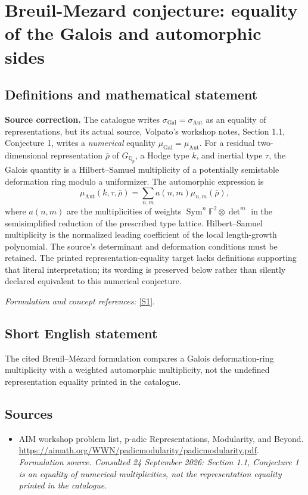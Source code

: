 \documentclass[11pt]{article}
\begin{document}
\section*{\texorpdfstring{Breuil-Mezard conjecture: equality of the Galois and automorphic sides}{Breuil-Mezard conjecture: equality of the Galois and automorphic sides}}\label{statement}
\subsection{Definitions and mathematical statement}
\textbf{Source correction.} The catalogue writes $\sigma_{\mathrm{Gal}}=\sigma_{\mathrm{Aut}}$ as an equality of representations, but its actual source, Volpato's workshop notes, Section 1.1, Conjecture 1, writes a \emph{numerical} equality $\mu_{\mathrm{Gal}}=\mu_{\mathrm{Aut}}$. For a residual two-dimensional representation $\bar\rho$ of $G_{{\mathbb{Q}}_p}$, a Hodge type $k$, and inertial type $\tau$, the Galois quantity is a Hilbert--Samuel multiplicity of a potentially semistable deformation ring modulo a uniformizer. The automorphic expression is
\[
 \mu_{\mathrm{Aut}}(k,\tau,\bar\rho)=\sum_{n,m}a(n,m)\mu_{n,m}(\bar\rho),
\]
where $a(n,m)$ are the multiplicities of weights
$\operatorname{Sym}^n{\mathbb{F}}^2\otimes\det^m$ in the semisimplified reduction of the prescribed type lattice. Hilbert--Samuel multiplicity is the normalized leading coefficient of the local length-growth polynomial. The source's determinant and deformation conditions must be retained. The printed representation-equality target lacks definitions supporting that literal interpretation; its wording is preserved below rather than silently declared equivalent to this numerical conjecture.
\par\smallskip\textit{Formulation and concept references:} \href{https://aimath.org/WWN/padicmodularity/padicmodularity.pdf}{[S1]}.

\subsection{Short English statement}
The cited Breuil–Mézard formulation compares a Galois deformation-ring multiplicity with a weighted automorphic multiplicity, not the undefined representation equality printed in the catalogue.
\subsection{Sources}
\begin{itemize}
\item[S1]AIM workshop problem list, p-adic Representations, Modularity, and Beyond.
\url{https://aimath.org/WWN/padicmodularity/padicmodularity.pdf}.
\textit{Formulation source. Consulted 24 September 2026: Section 1.1, Conjecture 1 is an equality of numerical multiplicities, not the representation equality printed in the catalogue.}
\end{itemize}
\end{document}

